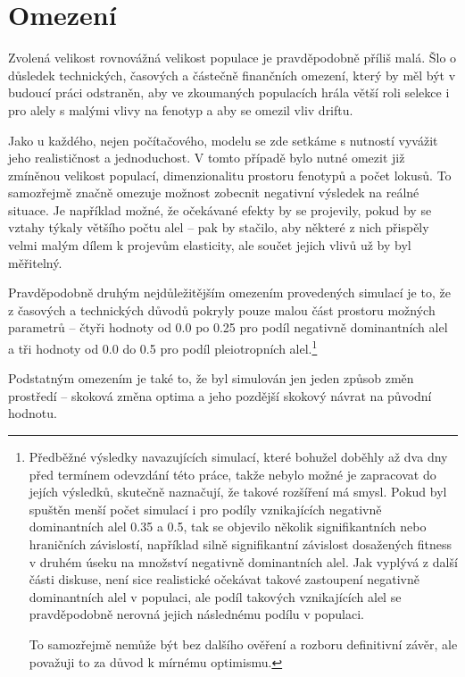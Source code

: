 \section{Omezení}

Zvolená velikost rovnovážná velikost populace je pravděpodobně příliš malá. Šlo o důsledek technických, časových a
částečně finančních omezení, který by měl být v budoucí práci odstraněn, aby ve zkoumaných populacích hrála
větší roli selekce i pro alely s malými vlivy na fenotyp a aby se omezil vliv driftu.

Jako u každého, nejen počítačového, modelu se zde setkáme s nutností vyvážit jeho realističnost a jednoduchost. V
tomto případě bylo nutné omezit již zmíněnou velikost populací, dimenzionalitu prostoru fenotypů a počet lokusů.
To samozřejmě značně omezuje možnost zobecnit negativní výsledek na reálné situace. Je například možné, že očekávané
efekty by se projevily, pokud by se vztahy týkaly většího počtu alel -- pak by stačilo, aby některé z nich přispěly
velmi malým dílem k projevům elasticity, ale součet jejich vlivů už by byl měřitelný.

Pravděpodobně druhým nejdůležitějším omezením provedených simulací je to, že z časových a technických důvodů
pokryly pouze malou část prostoru možných parametrů -- čtyři hodnoty od 0.0 po 0.25 pro podíl negativně dominantních
alel a tři hodnoty od 0.0 do 0.5 pro podíl pleiotropních alel.\footnote{
   Předběžné výsledky navazujících simulací, které bohužel doběhly až dva dny před termínem odevzdání této práce, takže
   nebylo možné je zapracovat do jejích výsledků,
   skutečně naznačují, že takové rozšíření má smysl. Pokud byl spuštěn menší
   počet simulací i pro podíly vznikajících negativně dominantních alel 0.35 a 0.5, tak se objevilo několik
   signifikantních nebo hraničních závislostí, například silně signifikantní závislost dosažených fitness v druhém
   úseku na množství negativně dominantních alel. Jak vyplývá z další části diskuse, není sice realistické očekávat
   takové zastoupení negativně dominantních alel v populaci, ale podíl takových vznikajících alel se pravděpodobně
   nerovná jejich následnému podílu v populaci.

   To samozřejmě nemůže být bez dalšího ověření a rozboru definitivní závěr, ale považuji to za důvod k mírnému optimismu.
}

Podstatným omezením je také to, že byl simulován jen jeden způsob změn prostředí -- skoková změna optima a jeho
pozdější skokový návrat na původní hodnotu.

